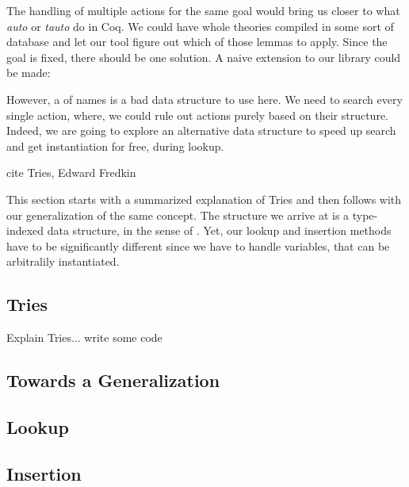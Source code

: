 The handling of multiple actions for the same goal would bring us closer to what
\emph{auto} or \emph{tauto} do in Coq. We could have whole theories compiled in some sort
of database and let our tool figure out which of those lemmas to apply. Since the goal is
fixed, there should be one solution. A naive extension to our library could be made:


However, a  of names is a bad data structure to use here. We need to search
every single action, where, we could rule out actions purely based on their structure.
Indeed, we are going to explore an alternative data structure to speed up search and get
instantiation for free, during lookup.

\begin{TODO}
  \item cite Tries, Edward Fredkin
\end{TODO}

This section starts with a summarized explanation of Tries and then follows with our
generalization of the same concept. The structure we arrive at is a type-indexed data structure,
in the sense of \cite{Hinze04}. Yet, our lookup and insertion methods have to be significantly different
since we have to handle variables, that can be arbitralily instantiated.

\subsection{Tries}

\begin{TODO}
  \item Explain Tries... write some code
\end{TODO}

\subsection{Towards a Generalization}

\subsection{Lookup}

\subsection{Insertion}
